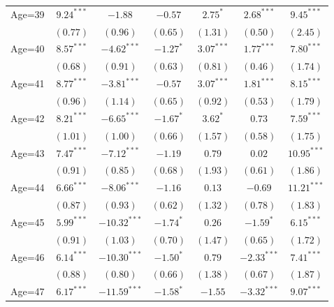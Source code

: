 \documentclass[fullpage]{paper}
\begin{document}
\begin{center}
\begin{longtable}{l c c c c c c }
Age=39      & $9.24^{***}$  & $-1.88$        & $-0.57$       & $2.75^{*}$     & $2.68^{***}$   & $9.45^{***}$  \\
            & $(0.77)$      & $(0.96)$       & $(0.65)$      & $(1.31)$       & $(0.50)$       & $(2.45)$      \\
Age=40      & $8.57^{***}$  & $-4.62^{***}$  & $-1.27^{*}$   & $3.07^{***}$   & $1.77^{***}$   & $7.80^{***}$  \\
            & $(0.68)$      & $(0.91)$       & $(0.63)$      & $(0.81)$       & $(0.46)$       & $(1.74)$      \\
Age=41      & $8.77^{***}$  & $-3.81^{***}$  & $-0.57$       & $3.07^{***}$   & $1.81^{***}$   & $8.15^{***}$  \\
            & $(0.96)$      & $(1.14)$       & $(0.65)$      & $(0.92)$       & $(0.53)$       & $(1.79)$      \\
Age=42      & $8.21^{***}$  & $-6.65^{***}$  & $-1.67^{*}$   & $3.62^{*}$     & $0.73$         & $7.59^{***}$  \\
            & $(1.01)$      & $(1.00)$       & $(0.66)$      & $(1.57)$       & $(0.58)$       & $(1.75)$      \\
Age=43      & $7.47^{***}$  & $-7.12^{***}$  & $-1.19$       & $0.79$         & $0.02$         & $10.95^{***}$ \\
            & $(0.91)$      & $(0.85)$       & $(0.68)$      & $(1.93)$       & $(0.61)$       & $(1.86)$      \\
Age=44      & $6.66^{***}$  & $-8.06^{***}$  & $-1.16$       & $0.13$         & $-0.69$        & $11.21^{***}$ \\
            & $(0.87)$      & $(0.93)$       & $(0.62)$      & $(1.32)$       & $(0.78)$       & $(1.83)$      \\
Age=45      & $5.99^{***}$  & $-10.32^{***}$ & $-1.74^{*}$   & $0.26$         & $-1.59^{*}$    & $6.15^{***}$  \\
            & $(0.91)$      & $(1.03)$       & $(0.70)$      & $(1.47)$       & $(0.65)$       & $(1.72)$      \\
Age=46      & $6.14^{***}$  & $-10.30^{***}$ & $-1.50^{*}$   & $0.79$         & $-2.33^{***}$  & $7.41^{***}$  \\
            & $(0.88)$      & $(0.80)$       & $(0.66)$      & $(1.38)$       & $(0.67)$       & $(1.87)$      \\
Age=47      & $6.17^{***}$  & $-11.59^{***}$ & $-1.58^{*}$   & $-1.55$        & $-3.32^{***}$  & $9.07^{***}$  \\

\end{longtable}
\end{center}
\end{document}
